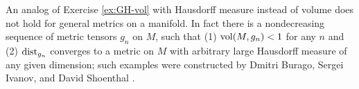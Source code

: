 An analog of Exercise \ref{ex:GH-vol} with Hausdorff measure instead of volume does not hold for general metrics on a manifold.
In fact there is a nondecreasing sequence of metric tensors $g_n$ on $M$, such that (1) $\operatorname{\rm vol}\nolimits(M,g_n)<1$ for any $n$ and (2) $\mathrm{dist}_{g_n}$ converges to a metric on $M$ with arbitrary large Hausdorff measure of any given dimension; such examples were constructed by Dmitri Burago, Sergei Ivanov, and David Shoenthal \cite{burago-ivanov-shoenthal}.
